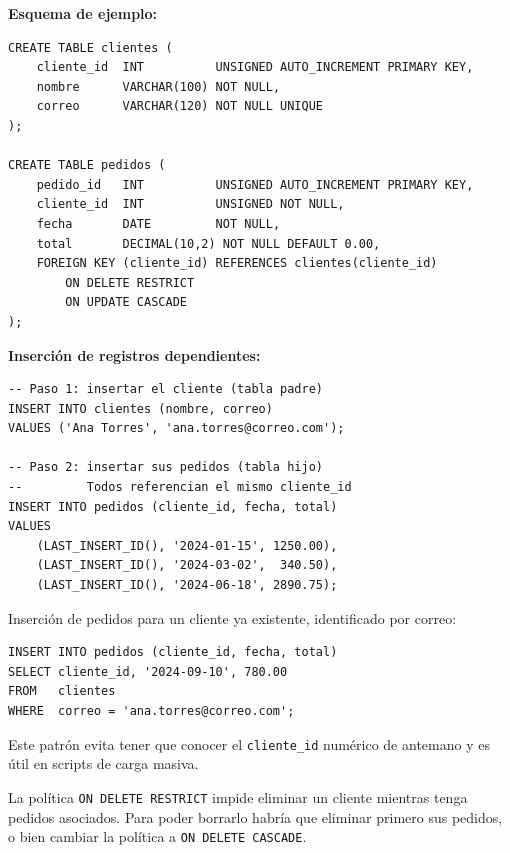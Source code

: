 \textbf{Esquema de ejemplo:}

\begin{lstlisting}[style=sql, caption={Tablas con relación 1:N — cliente y pedidos}]
CREATE TABLE clientes (
    cliente_id  INT          UNSIGNED AUTO_INCREMENT PRIMARY KEY,
    nombre      VARCHAR(100) NOT NULL,
    correo      VARCHAR(120) NOT NULL UNIQUE
);

CREATE TABLE pedidos (
    pedido_id   INT          UNSIGNED AUTO_INCREMENT PRIMARY KEY,
    cliente_id  INT          UNSIGNED NOT NULL,
    fecha       DATE         NOT NULL,
    total       DECIMAL(10,2) NOT NULL DEFAULT 0.00,
    FOREIGN KEY (cliente_id) REFERENCES clientes(cliente_id)
        ON DELETE RESTRICT
        ON UPDATE CASCADE
);
\end{lstlisting}

\textbf{Inserción de registros dependientes:}

\begin{lstlisting}[style=sql, caption={Inserción 1:N — un cliente con varios pedidos}]
-- Paso 1: insertar el cliente (tabla padre)
INSERT INTO clientes (nombre, correo)
VALUES ('Ana Torres', 'ana.torres@correo.com');

-- Paso 2: insertar sus pedidos (tabla hijo)
--         Todos referencian el mismo cliente_id
INSERT INTO pedidos (cliente_id, fecha, total)
VALUES
    (LAST_INSERT_ID(), '2024-01-15', 1250.00),
    (LAST_INSERT_ID(), '2024-03-02',  340.50),
    (LAST_INSERT_ID(), '2024-06-18', 2890.75);
\end{lstlisting}

\begin{ejemplo}
  Inserción de pedidos para un cliente ya existente, identificado por correo:

\begin{lstlisting}[style=sql, caption={INSERT ... SELECT para referenciar por atributo}]
INSERT INTO pedidos (cliente_id, fecha, total)
SELECT cliente_id, '2024-09-10', 780.00
FROM   clientes
WHERE  correo = 'ana.torres@correo.com';
\end{lstlisting}

  Este patrón evita tener que conocer el \texttt{cliente\_id} numérico de
  antemano y es útil en scripts de carga masiva.
\end{ejemplo}

\begin{nota}
  La política \texttt{ON DELETE RESTRICT} impide eliminar un cliente mientras
  tenga pedidos asociados. Para poder borrarlo habría que eliminar primero sus
  pedidos, o bien cambiar la política a \texttt{ON DELETE CASCADE}.
\end{nota}

